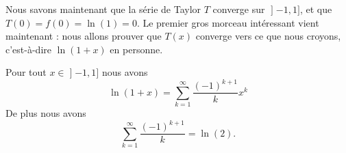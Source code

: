 Nous savons maintenant que la série de Taylor \( T\) converge sur \( \mathopen] -1 , 1 \mathclose]\), et que \( T(0)=f(0)=\ln(1)=0\). Le premier gros morceau intéressant vient maintenant : nous allons prouver que \( T(x)\) converge vers ce que nous croyons, c'est-à-dire \( \ln(1+x)\) en personne.

\begin{proposition}     \label{PROPooKPBIooJdNsqX}
Pour tout \( x\in\mathopen] -1 , 1 \mathclose]\) nous avons
    \begin{equation}        \label{EqweEZnV}
        \ln(1+x)=\sum_{k=1}^{\infty}\frac{ (-1)^{k+1} }{ k }x^k
    \end{equation}
    De plus nous avons
    \begin{equation}    \label{EqKUQmOZ}
        \sum_{k=1}^{\infty}\frac{ (-1)^{k+1} }{ k }=\ln(2).
    \end{equation}
\end{proposition}

